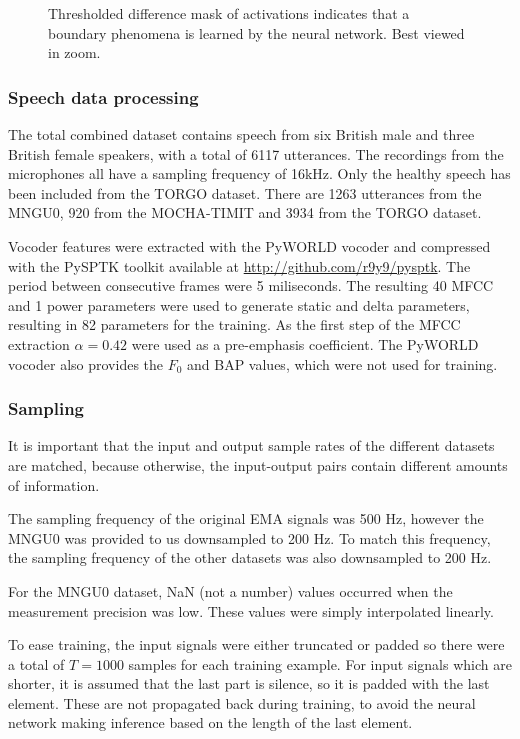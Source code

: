 \documentclass[a4paper]{article}
\begin{document}
\begin{figure}[t]
  \caption{Thresholded difference mask of activations indicates that a boundary phenomena is learned by the neural network. Best viewed in zoom.}
  \label{fig:mask}
  \begin{center}
    \scalebox{0.40}{}
\end{center}
\end{figure}
\subsubsection{Speech data processing}


The total combined dataset contains speech from six British male and three British
female speakers, with a total of 6117 utterances. The recordings from
the microphones all have a sampling frequency of 16kHz. Only the healthy speech has been
included from the TORGO dataset. There are 1263 utterances from the
MNGU0, 920 from the MOCHA-TIMIT and 3934 from the TORGO dataset.

Vocoder features were extracted with the PyWORLD vocoder \cite{Morise2016}
and compressed with the PySPTK toolkit available at
\url{http://github.com/r9y9/pysptk}. The period between consecutive
frames were 5 miliseconds. The resulting 40 MFCC and 1 power parameters
were used to generate static and delta parameters, resulting in 82
parameters for the training. As the first step of the MFCC extraction \( \alpha
= 0.42 \) were used as a pre-emphasis coefficient. The PyWORLD vocoder
also provides the $ F_0 $ and BAP values, which were not used for training.

\subsubsection{Sampling}

It is important that the input and output sample rates of the different
datasets are matched, because otherwise, the input-output pairs contain
different amounts of information.  

The sampling frequency of the original EMA signals was 500 Hz, however
the MNGU0 was provided to us downsampled to 200 Hz. To match this frequency,
the sampling frequency of the other datasets was also downsampled to 200 Hz.

For the MNGU0 dataset, NaN (not a number) values occurred when the measurement precision
was low. These values were simply interpolated linearly. 

To ease training, the input signals were either truncated or padded
so there were a total of \( T = 1000 \) samples for each training example.
For input signals which are shorter, it is assumed that the last part is
silence, so it is padded with the last element. These are not propagated back during training, to avoid the neural network making inference based on the length of the last element.
\end{document}
